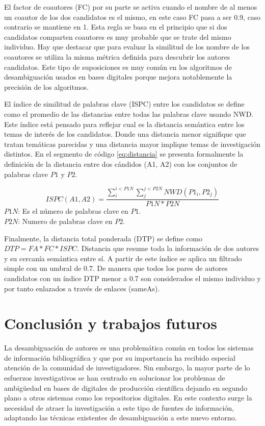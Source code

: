 \documentclass[conference]{IEEEtran}
\begin{document}
El factor de coautores (FC) por su parte se activa cuando el nombre de al menos un coautor de los dos candidatos es el mismo, en este caso FC pasa a ser 0.9, caso contrario se mantiene en 1. Esta regla se basa en el principio que si dos candidatos comparten coautores es muy probable que se trate del mismo individuo. Hay que destacar que para evaluar la similitud de los nombre de los coautores se utiliza la misma métrica definida para descubrir los autores candidatos. Este tipo de suposiciones es muy común en los algoritmos de desambiguación usados en bases digitales porque mejora notablemente la precisión de los algoritmos.

El índice de similitud de palabras clave (ISPC) entre los candidatos se define como el promedio de las distancias entre todas las palabras clave usando NWD. Este índice está pensado para reflejar cual es la distancia semántica entre los temas de interés de los candidatos. Donde una distancia menor signifique que tratan temáticas parecidas y una distancia mayor implique temas de investigación distintos. En el segmento de código \ref{eq:distancia} se presenta formalmente la definición de la distancia entre dos cándidos (A1, A2) con los conjuntos de  palabras clave $P1$ y $P2$.

\begin{equation}\label{eq:distancia}
ISPC(A1,A2) = \frac{\sum_i^{i<P1N}\sum_j^{j<P2N}NWD(P1_i, P2_j)}{P1N*P2N}
\end{equation}
$P1N$: Es el número de palabras clave en $P1$.\\
$P2N$: Numero de palabras clave en $P2$.

Finalmente, la distancia total ponderada (DTP) se define como $DTP= FA*FC*ISPC$. Distancia que resume toda la información de dos autores y su cercanía semántica entre sí. A partir de este índice se aplica un filtrado simple con un umbral de 0.7. De manera que todos los pares de autores candidatos con un índice DTP menor a 0.7 son considerados el mismo individuo y por tanto enlazados a través de enlaces (sameAs).


\section{Conclusión y trabajos futuros}
\label{sec:conclusion}
La desambiguación de autores es una problemática común en todos los sistemas de información bibliográfica y que por su importancia ha recibido especial atención de la comunidad de investigadores. Sin embargo, la mayor parte de lo esfuerzos investigativos se han centrado en solucionar los problemas de ambigüedad en bases de digitales de producción científica dejando   en segundo plano a otros sistemas como los repositorios digitales. En este contexto surge la necesidad de atraer la investigación a este tipo de fuentes de información, adaptando las técnicas existentes de desambiguación a este nuevo entorno.
\end{document}
